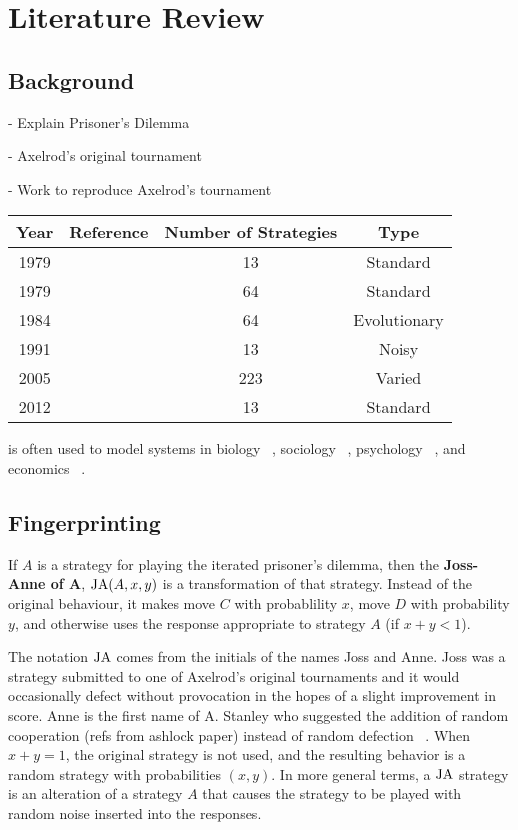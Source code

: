
\chapter{Literature Review}\label{cha:literature_review}

\section{Background}

- Explain Prisoner's Dilemma

- Axelrod's original tournament

- Work to reproduce Axelrod's tournament ~\cite{Knight2016}

\begin{tabular}{c c c c}\label{tab:tournament_refs}
Year & Reference & Number of Strategies & Type\\
\hline
1979 & & 13 & Standard\\
1979 & & 64 & Standard\\
1984 & & 64 & Evolutionary\\
1991 & & 13 & Noisy\\
2005 & & 223 & Varied\\
2012 & & 13 & Standard\\
\hline
\end{tabular}

is often used to model systems in biology ~\cite{Sigmund1999}, sociology ~\cite{Franken2005},
psychology ~\cite{Ishibuchi2005}, and economics ~\cite{Chong2005}.


\section{Fingerprinting}\label{sec:fingerprinting}

\begin{definition}\label{def:joss-ann}
If $A$ is a strategy for playing the iterated prisoner's dilemma, then the \textbf{Joss-Anne of A}, $\text{JA}(A, x, y)$ is a transformation of that strategy.
Instead of the original behaviour, it makes move $C$ with probablility $x$, move $D$ with probability $y$, and otherwise uses the response appropriate to strategy $A$ (if $x+y < 1$).
\end{definition}

The notation $\text{JA}$ comes from the initials of the names Joss and Anne.
Joss was a strategy submitted to one of Axelrod’s original tournaments and it would occasionally defect without provocation in the hopes of a slight improvement in score.
Anne is the first name of A. Stanley who suggested the addition of random cooperation (refs from ashlock paper) instead of random defection ~\cite{Ashlock2008}.
When $x + y = 1$, the original strategy is not used, and the resulting behavior is a random strategy with probabilities $(x, y)$.
In more general terms, a $\text{JA}$ strategy is an alteration of a strategy $A$ that causes the strategy to be played with random noise inserted into the responses.

